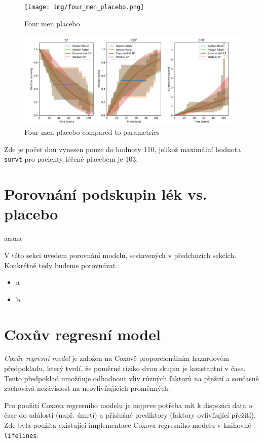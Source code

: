 \documentclass[a4, 11pt]{article}
\theoremstyle{definition}
\theoremstyle{remark}
\begin{document}
	\begin{figure}[H]
		\centering
		\texttt{[image: img/four\_men\_placebo.png]}
		\caption{Four men placebo}
		\label{fig:four_men_placebo}
	\end{figure}

	\begin{figure}[H]
	\centering
	\includegraphics[width=0.9\linewidth]{img/four_men_placebo_compared_to_parametrics.png}
	\caption{Four men placebo compared to parametrics}
	\label{fig:four_men_placebo}
\end{figure}
	
	Zde je počet dnů vynesen pouze do hodnoty 110, jelikož maximální hodnota \texttt{survt} pro pacienty léčené placebem je 103.
	
	
	\section{Porovnání podskupin lék vs. placebo} \label{sec:comparison_drug_vs_placebo}
	aaaaa
	
	V této sekci uvedem porovnání modelů, sestavených v předchozích sekcích. Konkrétně tedy budeme porovnávat 
	\begin{itemize}
		\item a
		\item b
	\end{itemize}

	
	
	\newpage
	\section{Coxův regresní model} \label{sec:cox_model}
	\textit{Coxův regresní model} je založen na Coxově proporcionálním hazardovém předpokladu, který tvrdí, že poměrné riziko dvou skupin je konstantní v čase. Tento předpoklad umožňuje odhadnout vliv různých faktorů na přežití a současně zachovává nezávislost na neovlivňujících proměnných.
	
	Pro použití Coxova regresního modelu je nejprve potřeba mít k dispozici data o čase do události (např. úmrtí) a příslušné prediktory (faktory ovlivňující přežití). Zde byla použita existující implementace Coxova regresního modelu v knihovně \texttt{lifelines}.
	
\end{document}
